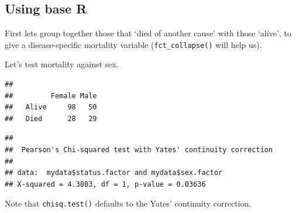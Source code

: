 \documentclass[12pt,]{krantz}
\makeatletter
\newenvironment{Shaded}{\begin{snugshade}}{\end{snugshade}}
\newcommand{\KeywordTok}[1]{\textcolor[rgb]{0.13,0.29,0.53}{\textbf{#1}}}
\newcommand{\NormalTok}[1]{#1}
\newcommand{\OperatorTok}[1]{\textcolor[rgb]{0.81,0.36,0.00}{\textbf{#1}}}
\newcommand{\StringTok}[1]{\textcolor[rgb]{0.31,0.60,0.02}{#1}}
\newenvironment{kframe}{%
\medskip{}
\setlength{\fboxsep}{.8em}
 \def\at@end@of@kframe{}%
 \ifinner\ifhmode%
  \def\at@end@of@kframe{\end{minipage}}%
  \begin{minipage}{\columnwidth}%
 \fi\fi%
 \def\FrameCommand##1{\hskip\@totalleftmargin \hskip-\fboxsep
 \colorbox{shadecolor}{##1}\hskip-\fboxsep
     \hskip-\linewidth \hskip-\@totalleftmargin \hskip\columnwidth}%
 \MakeFramed {\advance\hsize-\width
   \@totalleftmargin\z@ \linewidth\hsize
   \@setminipage}}%
 {\par\unskip\endMakeFramed%
 \at@end@of@kframe}
\renewenvironment{Shaded}{\begin{kframe}}{\end{kframe}}
\theoremstyle{definition}
\theoremstyle{definition}
\theoremstyle{definition}
\theoremstyle{remark}
\makeatother
\begin{document}
\hypertarget{using-base-r}{%
\subsection{Using base R}\label{using-base-r}}

First lets group together those that `died of another cause' with those
`alive', to give a disease-specific mortality variable
(\texttt{fct\_collapse()} will help us).

\begin{Shaded}
\end{Shaded}

Let's test mortality against sex.

\begin{Shaded}
\end{Shaded}

\begin{verbatim}
##        
##         Female Male
##   Alive     98   50
##   Died      28   29
\end{verbatim}

\begin{Shaded}
\end{Shaded}

\begin{verbatim}
## 
##  Pearson's Chi-squared test with Yates' continuity correction
## 
## data:  mydata$status.factor and mydata$sex.factor
## X-squared = 4.3803, df = 1, p-value = 0.03636
\end{verbatim}

Note that \texttt{chisq.test()} defaults to the Yates' continuity
correction.
\end{document}
